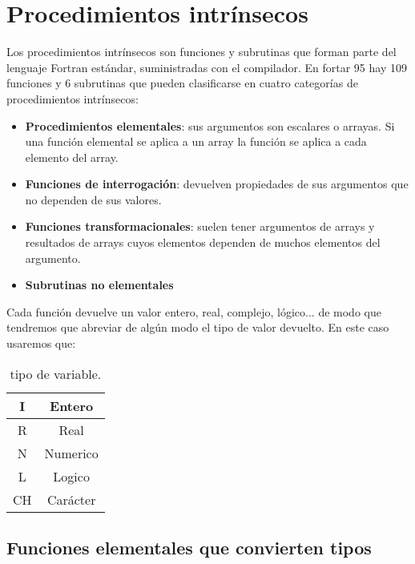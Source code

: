\section{Procedimientos intrínsecos}

Los procedimientos intrínsecos son funciones y subrutinas que forman parte del lenguaje Fortran estándar, suministradas con el compilador. En fortar 95 hay 109 funciones y 6 subrutinas que pueden clasificarse en cuatro categorías de procedimientos intrínsecos:

\begin{itemize}
	\item \textbf{Procedimientos elementales}: sus argumentos son escalares o arrayas. Si una función elemental se aplica a un array la función se aplica a cada elemento del array.
	\item \textbf{Funciones de interrogación}: devuelven propiedades de sus argumentos que no dependen de sus valores.
	\item \textbf{Funciones transformacionales}: suelen tener argumentos de arrays y resultados de arrays cuyos elementos dependen de muchos elementos del argumento.
	\item \textbf{Subrutinas no elementales}
\end{itemize}

Cada función devuelve un valor entero, real, complejo, lógico... de modo que tendremos que abreviar de algún modo el tipo de valor devuelto. En este caso usaremos que:


\begin{table}[h!] \centering
	\begin{tabular}{|c|c|}
		\hline 
		I & Entero \\ 
		\hline 
		R & Real \\
		\hline 
		N & Numerico  \\
		\hline 
		L & Logico \\
		\hline 
		CH & Carácter\\
		\hline 
	\end{tabular}
	\caption{tipo de variable.}
	\label{Tab:01-02}
\end{table}
\newpage

\subsection{Funciones elementales que convierten tipos}

